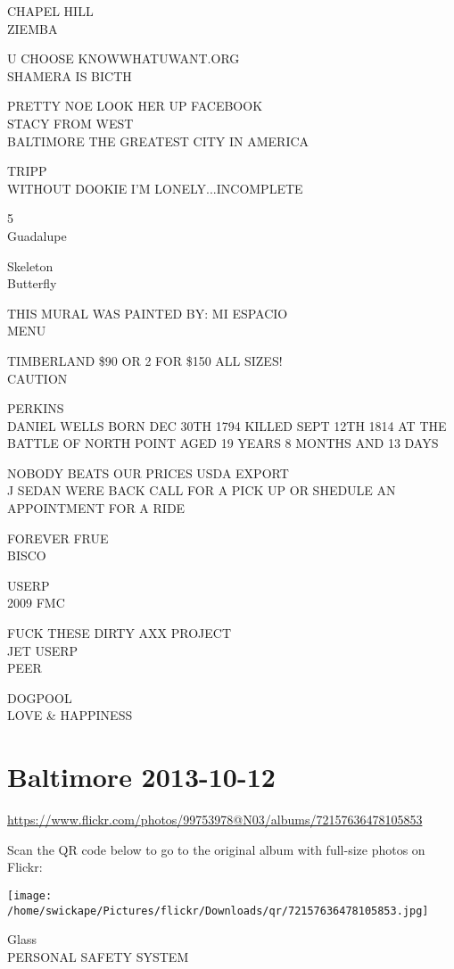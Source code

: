 \documentclass[10pt,letterpaper]{article}
\begin{document}
CHAPEL HILL\\
ZIEMBA

U CHOOSE KNOWWHATUWANT.ORG\\
SHAMERA IS BICTH

PRETTY NOE LOOK HER UP FACEBOOK\\
STACY FROM WEST\\
BALTIMORE THE GREATEST CITY IN AMERICA

TRIPP\\
WITHOUT DOOKIE I'M LONELY...INCOMPLETE

5\\
Guadalupe

Skeleton\\
Butterfly

THIS MURAL WAS PAINTED BY: MI ESPACIO\\
MENU

TIMBERLAND \$90 OR 2 FOR \$150 ALL SIZES!\\
CAUTION

PERKINS\\
DANIEL WELLS BORN DEC 30TH 1794 KILLED SEPT 12TH 1814 AT THE BATTLE OF NORTH POINT AGED 19 YEARS 8 MONTHS AND 13 DAYS

NOBODY BEATS OUR PRICES USDA EXPORT\\
J SEDAN WERE BACK CALL FOR A PICK UP OR SHEDULE AN APPOINTMENT FOR A RIDE

FOREVER FRUE\\
BISCO

USERP\\
2009 FMC

FUCK THESE DIRTY AXX PROJECT\\
JET USERP\\
PEER

DOGPOOL\\
LOVE \& HAPPINESS


\section*{Baltimore 2013-10-12}

\url{https://www.flickr.com/photos/99753978@N03/albums/72157636478105853}

Scan the QR code below to go to the original album with full-size photos on Flickr:

\texttt{[image: /home/swickape/Pictures/flickr/Downloads/qr/72157636478105853.jpg]}


Glass\\
PERSONAL SAFETY SYSTEM
\end{document}
